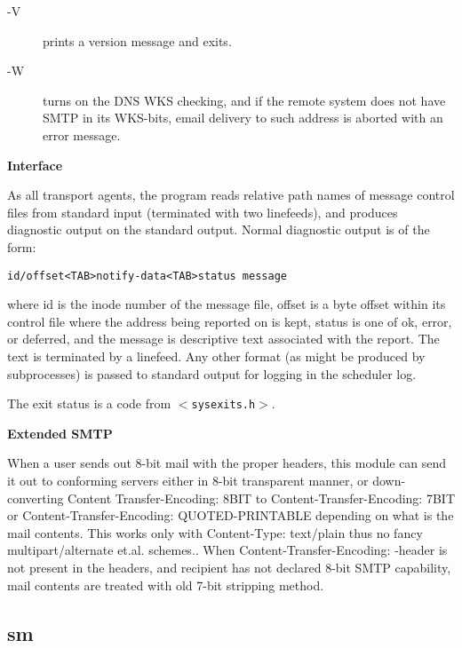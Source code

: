 \begin{description}
\item[-V] \mbox{}

prints a version message and exits.



\item[-W] \mbox{}

turns on the DNS WKS checking, and if the remote
system does not have SMTP in its WKS-bits, email
delivery to such address is aborted with an error
message.

\end{description}


{\bf Interface}

As all transport agents, the program reads relative path
names of message control files from standard input 
(terminated with two linefeeds), and produces diagnostic output
on the standard output. Normal diagnostic output is of
the form:

\begin{verbatim}
id/offset<TAB>notify-data<TAB>status message
\end{verbatim}


where id is the inode number of the message file, offset
is a byte offset within its control file where the address
being reported on is kept, status is one of ok, error, or
deferred, and the message is descriptive text associated
with the report. The text is terminated by a linefeed.
Any other format (as might be produced by subprocesses) is
passed to standard output for logging in the scheduler
log.

The exit status is a code from {\tt {\(<\)}sysexits.h{\(>\)}}.

{\bf Extended SMTP}

When a user sends out 8-bit mail with the proper headers, this
module can send it out to conforming servers either in
8-bit transparent manner, or down-converting Content 
Transfer-Encoding: 8BIT to Content-Transfer-Encoding: 7BIT
or Content-Transfer-Encoding: QUOTED-PRINTABLE depending
on what is the mail contents.
This works only with Content-Type: text/plain thus no
fancy multipart/alternate et.al. schemes..
When Content-Transfer-Encoding: -header is not present in
the headers, and recipient has not declared 8-bit SMTP
capability, mail contents are treated with old 7-bit
stripping method.








\subsection{sm}

